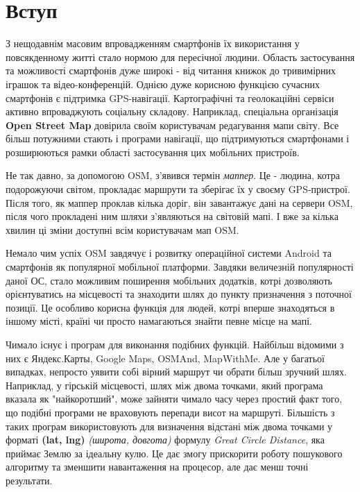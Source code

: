 \documentclass[simple,a4paper,14pt,ukrainian,utf8]{eskdtext}
\begin{document}
\tableofcontents

\newpage

  \newpage
  \section*{Вступ}

    З нещодавнім масовим впровадженням смартфонів їх використання у повсякденному житті стало нормою для пересічної людини. Область застосування та можливості смартфонів дуже широкі - від читання книжок до тривимірних іграшок та відео-конференцій. Однією дуже корисною функцією сучасних смартфонів є підтримка GPS-навігації. Картографічні та геолокаційні сервіси активно впроваджують соціальну складову. Наприклад, спеціальна організація \textbf{Open Street Map} довірила своїм користувачам редагування мапи світу. Все більш потужними стають і програми навігації, що підтримуються смартфонами і розширюються рамки області застосування цих мобільних пристроїв.

    Не так давно, за допомогою OSM, з’явився термін \textit{маппер}. Це - людина, котра подорожуючи світом, прокладає маршрути та зберігає їх у своєму GPS-пристрої. Після того, як маппер проклав кілька доріг, він завантажує дані на сервери OSM, після чого прокладені ним шляхи з’являються на світовій мапі. І вже за кілька хвилин ці зміни доступні всім користувачам мап OSM.
    
    Немало чим успіх OSM завдячує і розвитку операційної системи Android та смартфонів як популярної мобільної платформи. Завдяки величезній популярності даної ОС, стало можливим поширення мобільних додатків, котрі дозволяють орієнтуватись на місцевості та знаходити шлях до пункту призначення з поточної позиції. Це особливо корисна функція для людей, котрі вперше знаходяться в іншому місті, країні чи просто намагаються знайти певне місце на мапі.
    
    Чимало існує і програм для виконання подібних функцій. Найбільш відомими з них є Яндекс.Карты, Google Maps, OSMAnd, MapWithMe. Але у багатьої випадках, непросто уявити собі вірний маршрут чи обрати більш зручний шлях. Наприклад, у гірській місцевості, шлях між двома точками, який програма вказала як "найкоротший", може зайняти чимало часу через простий факт того, що подібні програми не враховують перепади висот на маршруті. Більшість з таких програм використовують для визначення відстані між двома точками у форматі \textbf{(lat, lng)} \textit{(широта, довгота)} формулу \textit{Great Circle Distance}, яка приймає Землю за ідеальну кулю. Це дає змогу прискорити роботу пошукового алгоритму та зменшити навантаження на процесор, але дає менш точні результати.
    
\end{document}
